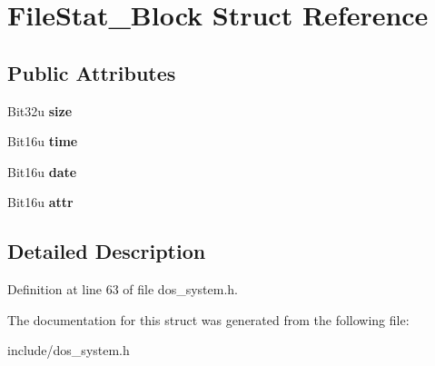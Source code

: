 \hypertarget{structFileStat__Block}{\section{File\-Stat\-\_\-\-Block Struct Reference}
\label{structFileStat__Block}
}
\subsection*{Public Attributes}
\begin{DoxyCompactItemize}
\item 
\hypertarget{structFileStat__Block_a2a5d3c6eb19aa8c2a9cb6f490c5401c4}{Bit32u {\bfseries size}}\label{structFileStat__Block_a2a5d3c6eb19aa8c2a9cb6f490c5401c4}

\item 
\hypertarget{structFileStat__Block_a6c1eab1a66932b922bb569b0322ec31c}{Bit16u {\bfseries time}}\label{structFileStat__Block_a6c1eab1a66932b922bb569b0322ec31c}

\item 
\hypertarget{structFileStat__Block_aa1b125d12e215d896e585f117d0de3a3}{Bit16u {\bfseries date}}\label{structFileStat__Block_aa1b125d12e215d896e585f117d0de3a3}

\item 
\hypertarget{structFileStat__Block_a53c660e26cd1bf70780c95cc8c605c33}{Bit16u {\bfseries attr}}\label{structFileStat__Block_a53c660e26cd1bf70780c95cc8c605c33}

\end{DoxyCompactItemize}


\subsection{Detailed Description}


Definition at line 63 of file dos\-\_\-system.\-h.



The documentation for this struct was generated from the following file\-:\begin{DoxyCompactItemize}
\item 
include/dos\-\_\-system.\-h\end{DoxyCompactItemize}
